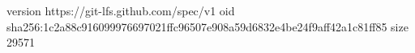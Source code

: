 version https://git-lfs.github.com/spec/v1
oid sha256:1c2a88c916099976697021ffc96507e908a59d6832e4be24f9aff42a1c81ff85
size 29571
